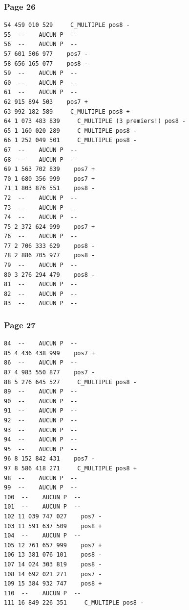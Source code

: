 \documentclass[11pt,a4paper]{article}
\begin{document}
\subsubsection*{Page 26}
\begin{Verbatim}[fontsize=\footnotesize]
54 459 010 529     C_MULTIPLE pos8 - 
55  --    AUCUN P  --  
56  --    AUCUN P  --  
57 601 506 977    pos7 - 
58 656 165 077    pos8 - 
59  --    AUCUN P  --  
60  --    AUCUN P  --  
61  --    AUCUN P  --  
62 915 894 503    pos7 + 
63 992 182 589     C_MULTIPLE pos8 + 
64 1 073 483 839     C_MULTIPLE (3 premiers!) pos8 - 
65 1 160 020 289     C_MULTIPLE pos8 - 
66 1 252 049 501     C_MULTIPLE pos8 - 
67  --    AUCUN P  --  
68  --    AUCUN P  --  
69 1 563 702 839    pos7 + 
70 1 680 356 999    pos7 + 
71 1 803 876 551    pos8 - 
72  --    AUCUN P  --  
73  --    AUCUN P  --  
74  --    AUCUN P  --  
75 2 372 624 999    pos7 + 
76  --    AUCUN P  --  
77 2 706 333 629    pos8 - 
78 2 886 705 977    pos8 - 
79  --    AUCUN P  --  
80 3 276 294 479    pos8 - 
81  --    AUCUN P  --  
82  --    AUCUN P  --  
83  --    AUCUN P  --  
\end{Verbatim}
\medskip
\subsubsection*{Page 27}
\begin{Verbatim}[fontsize=\footnotesize]
84  --    AUCUN P  --  
85 4 436 438 999    pos7 + 
86  --    AUCUN P  --  
87 4 983 550 877    pos7 - 
88 5 276 645 527     C_MULTIPLE pos8 - 
89  --    AUCUN P  --  
90  --    AUCUN P  --  
91  --    AUCUN P  --  
92  --    AUCUN P  --  
93  --    AUCUN P  --  
94  --    AUCUN P  --  
95  --    AUCUN P  --  
96 8 152 842 431    pos7 - 
97 8 586 418 271     C_MULTIPLE pos8 + 
98  --    AUCUN P  --  
99  --    AUCUN P  --  
100  --    AUCUN P  --  
101  --    AUCUN P  --  
102 11 039 747 027    pos7 - 
103 11 591 637 509    pos8 + 
104  --    AUCUN P  --  
105 12 761 657 999    pos7 + 
106 13 381 076 101    pos8 - 
107 14 024 303 819    pos8 - 
108 14 692 021 271    pos7 - 
109 15 384 932 747    pos8 + 
110  --    AUCUN P  --  
111 16 849 226 351     C_MULTIPLE pos8 - 
 
\end{Verbatim}
\medskip
\end{document}
